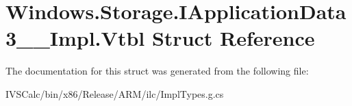 \hypertarget{struct_windows_1_1_storage_1_1_i_application_data3_____impl_1_1_vtbl}{}\section{Windows.\+Storage.\+I\+Application\+Data3\+\_\+\+\_\+\+Impl.\+Vtbl Struct Reference}
\label{struct_windows_1_1_storage_1_1_i_application_data3_____impl_1_1_vtbl}


The documentation for this struct was generated from the following file\+:\begin{DoxyCompactItemize}
\item 
I\+V\+S\+Calc/bin/x86/\+Release/\+A\+R\+M/ilc/Impl\+Types.\+g.\+cs\end{DoxyCompactItemize}
